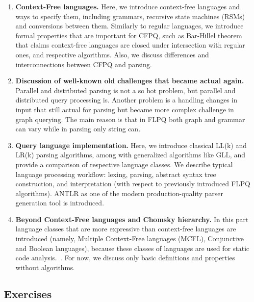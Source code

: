 \documentclass[sigconf]{acmart}
\begin{document}
\begin{enumerate}
  \item \label{cf_languages_intro} \textbf{Context-Free languages.} Here, we introduce context-free languages and ways to specify them, including grammars, recursive state machines (RSMs) and conversions between them.
  Similarly to regular languages, we introduce formal properties that are important for CFPQ, such as Bar-Hillel theorem that claims context-free languages are closed under intersection with regular ones, and respective algorithms.
  Also, we discuss differences and interconnections between CFPQ and parsing.
  
  \item \label{new_old_problems_discussion} \textbf{Discussion of well-known old challenges that became actual again.} 
  Parallel and distributed parsing is not a so hot problem, but parallel and distributed query processing is. 
  Another problem is a handling changes in input that still actual for parsing but became more complex challenge in graph querying.
  The main reason is that in FLPQ both graph and grammar can vary while in parsing only string can.
  
  \item \label{parsing_techniques} \textbf{Query language implementation.}
  Here, we introduce classical LL(k) and LR(k) parsing algorithms, among with generalized algorithms like GLL, and provide a comparison of respective language classes.
  We describe typical language processing workflow: lexing, parsing, abstract syntax tree construction, and interpretation (with respect to previously introduced FLPQ algorithms).
  ANTLR as one of the modern production-quality parser generation tool is introduced.
  
  \item \label{beyond_chomsky_hierarchy} \textbf{Beyond Context-Free languages and Chomsky hierarchy.}
  In this part language classes that are more expressive than context-free languages are introduced (namely, Multiple Context-Free languages (MCFL), Conjunctive and Boolean languages), because these classes of languages are used for static code analysis.~\cite{10.1145/3009837.3009848, 10.1145/3704854}. 
  For now, we discuss only basic definitions and properties without algorithms. 
\end{enumerate}


\subsection{Exercises}
\end{document}
